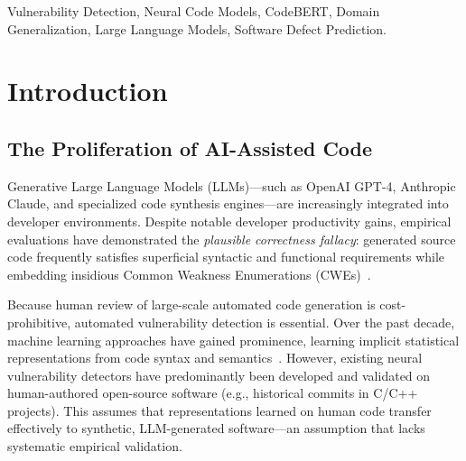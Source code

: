 \documentclass[conference]{IEEEtran}
\begin{document}
\begin{abstract}
Our empirical findings demonstrate: (1) \textbf{In-Distribution Efficacy:} CodeBERT achieves 66.36\% accuracy, 64.71\% Macro F1, and 0.7301 ROC-AUC on human code, outperforming classical baselines; (2) \textbf{Domain Generalization Collapse:} When evaluated zero-shot on LLM-generated code ($N=4,120$), CodeBERT suffers a severe performance drop of $-56.48\%$ in Macro F1 (falling to 8.23\%) due to an acute false-positive surge triggered by stylistic distribution shift; (3) \textbf{Patch Discrimination Blindness:} On 2,480 balanced pairs of CVE vulnerabilities and patches (SeCodePLT), zero-shot models perform at near random guessing (50.00\% accuracy, 0.4993 ROC-AUC), proving that sequence-level pooled classifiers fail to capture localized, surgical vulnerability repairs; and (4) \textbf{Benchmark Memorization:} Devign's official test split shares 100\% of its repositories with its training set, indicating that reported in-distribution metrics partially reflect repository memorization. We release our complete reproducible artifact, model checkpoints, and evaluation suite.
\end{abstract}

\begin{IEEEkeywords}
Vulnerability Detection, Neural Code Models, CodeBERT, Domain Generalization, Large Language Models, Software Defect Prediction.
\end{IEEEkeywords}

\section{Introduction}

\subsection{The Proliferation of AI-Assisted Code}
Generative Large Language Models (LLMs)---such as OpenAI GPT-4, Anthropic Claude, and specialized code synthesis engines---are increasingly integrated into developer environments. Despite notable developer productivity gains, empirical evaluations have demonstrated the \textit{plausible correctness fallacy}: generated source code frequently satisfies superficial syntactic and functional requirements while embedding insidious Common Weakness Enumerations (CWEs)~\cite{pearce2022asleep}.

Because human review of large-scale automated code generation is cost-prohibitive, automated vulnerability detection is essential. Over the past decade, machine learning approaches have gained prominence, learning implicit statistical representations from code syntax and semantics~\cite{zhou2019devign, feng2020codebert, lu2021codexglue}. However, existing neural vulnerability detectors have predominantly been developed and validated on human-authored open-source software (e.g., historical commits in C/C++ projects). This assumes that representations learned on human code transfer effectively to synthetic, LLM-generated software---an assumption that lacks systematic empirical validation.
\end{document}
